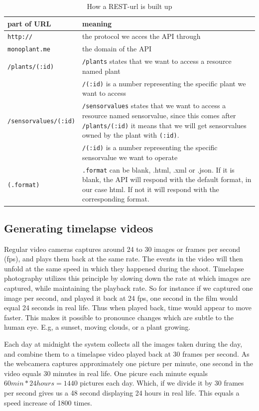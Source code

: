 \bgroup
\def\arraystretch{1.8}	%
\begin{table}
	\centering
	\begin{tabular}{@{}lp{250pt}@{}} \toprule
		\textbf{part of URL}&	\textbf{meaning}\\ \midrule
		\texttt{http://}&	the protocol we acces the API through\\ 
		\texttt{monoplant.me}&	the domain of the API\\ 
		\texttt{/plants/(:id)}&	\texttt{/plants} states that we want to access a resource named plant \\ &
		\texttt{/(:id)} is a number representing the specific plant we want to access\\ 
		\texttt{/sensorvalues/(:id)}&	\texttt{/sensorvalues} states that we want to access a resource named sensorvalue, since this comes after \texttt{/plants/(:id)} it means that we will get sensorvalues owned by the plant with \texttt{(:id)}. \\ &
		\texttt{/(:id)} is a number representing the specific sensorvalue we want to operate\\ 
		\texttt{(.format)}&	 \texttt{.format} can be blank, .html, .xml or .json. If it is blank, the API will respond with the default format, in our case html. If not it will respond with the corresponding format.\\ \bottomrule
	\end{tabular}
	\caption{How a REST-url is built up}
	\label{fig:RESTurl}
\end{table}
\egroup

\subsection{Generating timelapse videos}
Regular video cameras captures around 24 to 30 images or frames per second (fps), and plays them back at the same rate. The events in the video will then unfold at the same speed in which they happened during the shoot. Timelapse photography utilizes this principle by slowing down the rate at which images are captured, while maintaining the playback rate. So for instance if we captured one image per second, and played it back at 24 fps, one second in the film would equal 24 seconds in real life. Thus when played back, time would appear to move faster. This makes it possible to pronounce changes which are subtle to the human eye. E.g, a sunset, moving clouds, or a plant growing.  

Each day at midnight the system collects all the images taken during the day, and combine them to a timelapse video played back at 30 frames per second. As the webcamera captures approximately one picture per minute, one second in the video equals 30 minutes in real life. One picure each minute equals \begin{math} 60min*24hours=1440 \end{math}
pictures each day. Which, if we divide it by 30 frames per second gives us a 48 second displaying 24 hours in real life. This equals a speed increase of 1800 times. 

